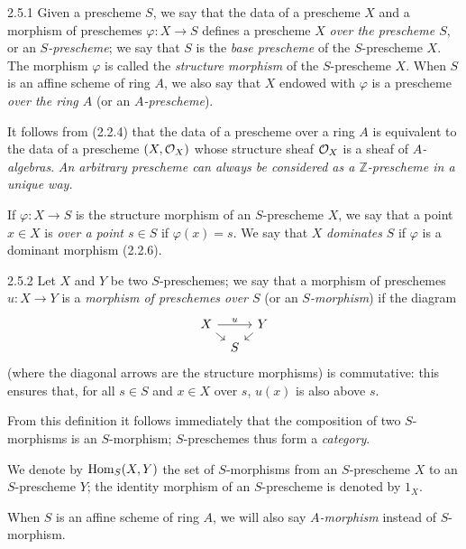 \documentclass[../main.tex]{subfiles}
\begin{document}
\begin{cx}[Definition]{2.5.1}
    Given a prescheme $S$, we say that the data of a prescheme $X$ and a morphism of preschemes $\varphi\colon X\to S$ defines a prescheme $X$ \emph{over the prescheme $S$}, or an \emph{$S$-prescheme}; we say that $S$ is the \emph{base prescheme} of the $S$-prescheme $X$.
    The morphism $\varphi$ is called the \emph{structure morphism} of the $S$-prescheme $X$.
    When $S$ is an affine scheme of ring $A$, we also say that $X$ endowed with $\varphi$ is a prescheme \emph{over the ring $A$} (or an \emph{$A$-prescheme}).
\end{cx}

It follows from (2.2.4) that the data of a prescheme over a ring $A$ is equivalent to the data of a prescheme $(X,\mathcal{O}_X)$ whose structure sheaf $\mathcal{O}_X$ is a sheaf of \emph{$A$-algebras}.
\emph{An arbitrary prescheme can always be considered as a $\mathbb{Z}$-prescheme in a unique way.}

If $\varphi\colon X\to S$ is the structure morphism of an $S$-prescheme $X$, we say that a point $x\in X$ is \emph{over a point $s\in S$} if $\varphi(x)=s$.
We say that $X$ \emph{dominates} $S$ if $\varphi$ is a dominant morphism (2.2.6).

\begin{cx}{2.5.2}
    Let $X$ and $Y$ be two $S$-preschemes; we say that a morphism of preschemes $u\colon X\to Y$ is a \emph{morphism of preschemes over $S$} (or an \emph{$S$-morphism}) if the diagram
    \begin{equation*}
        \begin{tikzcd}[column sep=tiny, row sep=tiny]
            X \arrow[rr,"u"] \arrow[dr] & & Y \arrow[dl]\\
            & S &
        \end{tikzcd}
    \end{equation*}
    (where the diagonal arrows are the structure morphisms) is commutative: this ensures that, for all $s\in S$ and $x\in X$ over $s$, $u(x)$ is also above $s$.
\end{cx}

From this definition it follows immediately that the composition of two $S$-morphisms is an $S$-morphism; $S$-preschemes thus form a \emph{category}.

We denote by $\operatorname*{Hom}_S(X,Y)$ the set of $S$-morphisms from an $S$-prescheme $X$ to an $S$-prescheme $Y$; the identity morphism of an $S$-prescheme is denoted by $1_X$.

When $S$ is an affine scheme of ring $A$, we will also say \emph{$A$-morphism} instead of $S$-morphism.
\end{document}
